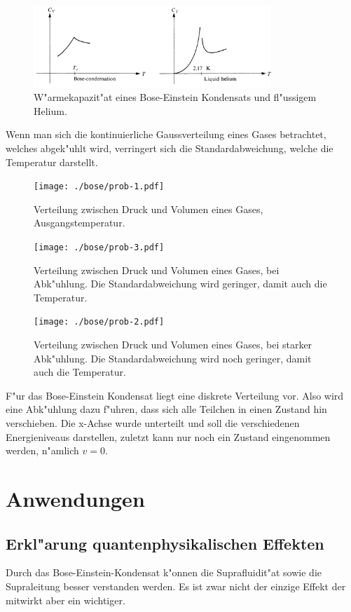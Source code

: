 \begin{refsection}
\begin{figure}
    \centering
    \includegraphics[width = 0.8\textwidth]{./bose/wrmkap.jpg}
    \caption[W"armekapazit"at eines Bose-Einstein Kondensats und fl"ussigem Helium.]{W"armekapazit"at eines Bose-Einstein Kondensats und fl"ussigem Helium. \cite{bose:feynman}}
    \label{fig:WrmKap}
\end{figure}
Wenn man sich die kontinuierliche Gaussverteilung eines Gases betrachtet, welches abgek"uhlt wird, verringert sich die Standardabweichung, welche die Temperatur darstellt.

\begin{figure}
    \centering
    \texttt{[image: ./bose/prob-1.pdf]}
    \caption[Verteilung Ausgangstemperatur]{Verteilung zwischen Druck und Volumen eines Gases, Ausgangstemperatur.
    \label{fig:Gauss1}}
    \texttt{[image: ./bose/prob-3.pdf]}
    \caption[Verteilung bei Abk"uhlung]{Verteilung zwischen Druck und Volumen eines Gases, bei Abk"uhlung. Die Standardabweichung wird geringer, damit auch die Temperatur.
	\label{fig:Gauss2}}
    \texttt{[image: ./bose/prob-2.pdf]}
    \caption[Verteilung bei starker Abk"uhlung]{Verteilung zwischen Druck und Volumen eines Gases, bei starker Abk"uhlung. Die Standardabweichung wird noch geringer, damit auch die Temperatur.
	\label{fig:Gauss3}}
\end{figure}
F"ur das Bose-Einstein Kondensat liegt eine diskrete Verteilung vor.
Also wird eine Abk"uhlung dazu f"uhren, dass sich alle Teilchen in einen Zustand hin verschieben. Die x-Achse wurde unterteilt und soll die verschiedenen Energieniveaus darstellen, zuletzt kann nur noch ein Zustand eingenommen werden, n"amlich $v = 0$. 

\section{Anwendungen}
\subsection{Erkl"arung quantenphysikalischen Effekten}
Durch das Bose-Einstein-Kondensat k"onnen die Suprafluidit"at sowie die Supraleitung besser verstanden werden. Es ist zwar nicht der einzige Effekt der mitwirkt aber ein wichtiger. 


\end{refsection}
